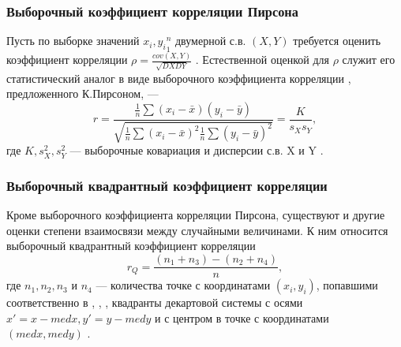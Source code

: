 \documentclass[../body.tex]{subfiles}
\begin{document}
	\subsubsection{Выборочный коэффициент корреляции Пирсона}
	Пусть по выборке значений ${x_{i},y_{i}}^{n}_{1}$ двумерной с.в. $(X,Y )$ требуется оценить коэффициент корреляции $\rho = \frac{cov(X,Y)}{\sqrt{DXDY}}$ . Естественной оценкой для $\rho$ служит его статистический аналог в виде выборочного коэффициента корреляции , предложенного К.Пирсоном, —
	\begin{equation}
		r = \frac{
			\frac{1}{n}\sum{(x_{i} - \bar{x})(y_{i}-\bar{y})}
		}{
			\sqrt{\frac{1}{n}\sum{(x_{i} - \bar{x})^{2}}\frac{1}{n}\sum{(y_{i} - \bar{y})^{2}}}
		}=\frac{K}{s_{X}s_{Y}},
		\label{r}
	\end{equation}
	где $K,s^{2}_{X},s^{2}_{Y}$ — выборочные ковариация и дисперсии с.в. X и Y \cite[c.~535]{max}.
	
	
	\subsubsection{Выборочный квадрантный коэффициент корреляции}
	Кроме выборочного коэффициента корреляции Пирсона, существуют и другие оценки степени взаимосвязи между случайными величинами. К ним относится выборочный квадрантный коэффициент корреляции
	\begin{equation}
		r_{Q} = \frac{(n_{1} + n_{3}) - (n_{2} + n_{4})}{n},
		\label{rQ}
	\end{equation}
	где $n_{1}, n_{2},n_{3}$ и $n_{4}$ — количества точке с координатами $(x_{i},y_{i})$, попавшими соответственно в , , ,   квадранты декартовой системы с осями $x′ = x-med x, y′ = y- med y$  и с центром в точке с координатами $(med x,med y)$ \cite[c.~539]{max}.
	
	
	
\end{document}
